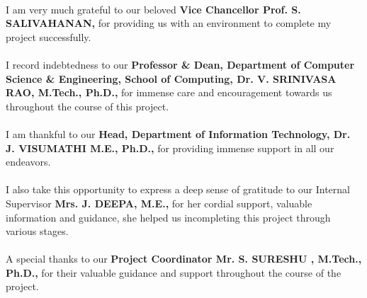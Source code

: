 \documentclass[10pt]{report}
\begin{document}
\large{\paragraph{}I am very much grateful to our beloved \textbf{Vice Chancellor Prof. S.
SALIVAHANAN,} for providing us with an environment to complete my project successfully.}
\large{\paragraph{}I record indebtedness to our \textbf{Professor \& Dean, Department of
Computer
Science \& Engineering, School of Computing, Dr. V. SRINIVASA RAO, M.Tech., Ph.D.,} for immense
care and encouragement
towards us throughout the course of this project.}

\large{\paragraph{}I am thankful to our \textbf{Head, Department of Information Technology, Dr. J. VISUMATHI M.E., Ph.D.,} for providing immense support in all our endeavors.}
\large{\paragraph{}I also take this opportunity to express a deep sense of gratitude to our Internal Supervisor \textbf{Mrs. J. DEEPA, M.E.,} for her cordial support, valuable information and guidance, she helped us incompleting this project through various stages. }
\large{\paragraph{}A special thanks to our \textbf{Project Coordinator Mr. S. SURESHU , M.Tech., Ph.D.,} for their valuable guidance and support throughout the course of the project.}
\end{document}
